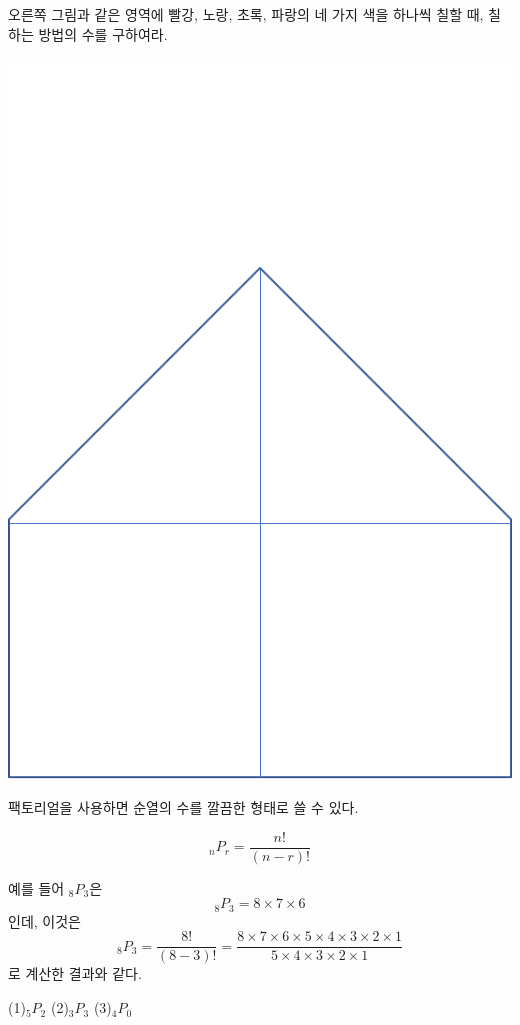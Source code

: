 \documentclass{oblivoir}
\begin{document}
\noindent
\begin{minipage}{0.7\textwidth}
%
\prob{}\label{perm12}
오른쪽 그림과 같은 영역에 빨강, 노랑, 초록, 파랑의 네 가지 색을 하나씩 칠할 때, 칠하는 방법의 수를 구하여라.
\end{minipage}
\begin{minipage}{0.25\textwidth}
\centering
\includegraphics[width=.8\textwidth]{perm_12}
\end{minipage}

\newpage
팩토리얼을 사용하면 순열의 수를 깔끔한 형태로 쓸 수 있다.
\begin{mdframed}
%
\theo{}\label{perm13}
\[_nP_r=\frac{n!}{(n-r)!}\]
\end{mdframed}
예를 들어 \(_8P_3\)은
\[_8P_3=8\times7\times6\]
인데, 이것은
\[_8P_3=\frac{8!}{(8-3)!}=\frac{8\times7\times6\times5\times4\times3\times2\times1}{5\times4\times3\times2\times1}\]
로 계산한 결과와 같다.

%
\label{perm14}
(1)\;\;\(_5P_2\)\hspace{0.26\textwidth}
(2)\;\;\(_3P_3\)\hspace{0.26\textwidth}
(3)\;\;\(_4P_0\)
\end{document}
